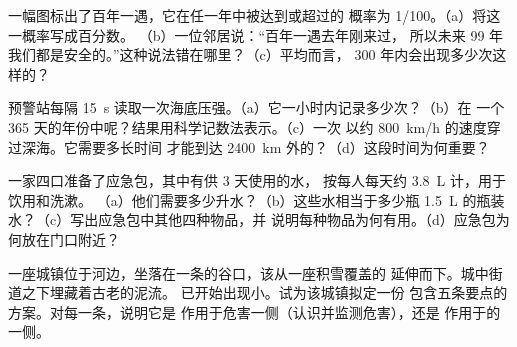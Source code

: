 \begin{exercise}[$\star\star$]\label{exo:g9:natural-risks:9}
一幅图标出了百年一遇，它在任一年中被达到或超过的
概率为 1/100。（a）将这一概率写成百分数。
（b）一位邻居说：“百年一遇去年刚来过，
所以未来 99 年我们都是安全的。”这种说法错在哪里？（c）平均而言，
300 年内会出现多少次这样的？
\end{exercise}

\begin{exercise}[$\star\star$]\label{exo:g9:natural-risks:10}
预警站每隔
\qty{15}{s} 读取一次海底压强。（a）它一小时内记录多少次？（b）在
一个 365 天的年份中呢？结果用科学记数法表示。（c）一次
以约 \qty{800}{km/h} 的速度穿过深海。它需要多长时间
才能到达 \qty{2400}{km} 外的？（d）这段时间为何重要？
\end{exercise}

\begin{exercise}[$\star\star\star$]\label{exo:g9:natural-risks:11}
一家四口准备了应急包，其中有供 3 天使用的水，
按每人每天约 \qty{3.8}{L} 计，用于饮用和洗漱。
（a）他们需要多少升水？（b）这些水相当于多少瓶
\qty{1.5}{L} 的瓶装水？（c）写出应急包中其他四种物品，并
说明每种物品为何有用。（d）应急包为何放在门口附近？
\end{exercise}

\begin{exercise}[$\star\star\star$]\label{exo:g9:natural-risks:12}
一座城镇位于河边，坐落在一条的谷口，该从一座积雪覆盖的
延伸而下。城中街道之下埋藏着古老的泥流。
已开始出现小。试为该城镇拟定一份
包含五条要点的方案。对每一条，说明它是
作用于危害一侧（认识并监测危害），还是
作用于的一侧。
\end{exercise}

